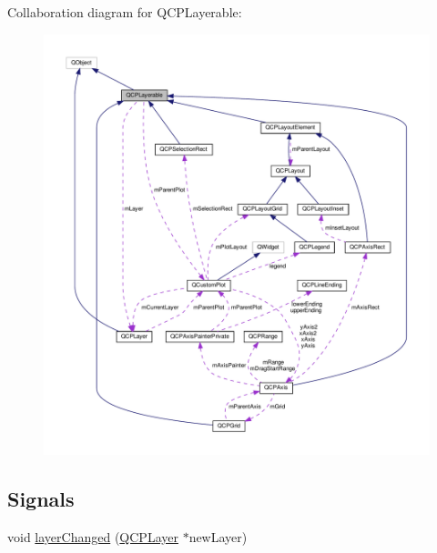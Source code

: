 Collaboration diagram for Q\+C\+P\+Layerable\+:\nopagebreak
\begin{figure}[H]
\begin{center}
\leavevmode
\includegraphics[width=350pt]{classQCPLayerable__coll__graph}
\end{center}
\end{figure}
\subsection*{Signals}
\begin{DoxyCompactItemize}
\item 
void \hyperlink{classQCPLayerable_abbf8657cedea73ac1c3499b521c90eba}{layer\+Changed} (\hyperlink{classQCPLayer}{Q\+C\+P\+Layer} $\ast$new\+Layer)
\end{DoxyCompactItemize}
